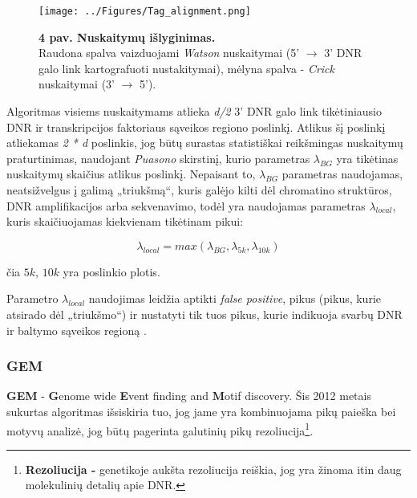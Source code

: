 \documentclass[12pt]{article}
\begin{document}
\begin{figure}[ht]
    \begin{center}
        \captionsetup{justification=centering}
        \texttt{[image: ../Figures/Tag\_alignment.png]}
        \vspace{-1\baselineskip}
        \caption*{\small\textbf{4 pav. Nuskaitymų išlyginimas.}\\Raudona spalva
            vaizduojami \emph{Watson} nuskaitymai (5' \(\rightarrow\) 3' DNR
            galo link kartografuoti nustakitymai),
            mėlyna spalva - \emph{Crick} nuskaitymai (3' \(\rightarrow\) 5').}
    \end{center}
\end{figure}

Algoritmas visiems nuskaitymams atlieka \emph{d/2} 3' DNR galo link
tikėtiniausio DNR ir transk\-rip\-ci\-jos faktoriaus sąveikos regiono poslinkį.
Atlikus šį poslinkį atliekamas \emph{2 * d} poslinkis, jog būtų surastas
statistiškai reikšmingas nuskaitymų praturtinimas, naudojant \emph{Puasono}
skirstinį, kurio parametras \(\lambda_{BG}\) yra tikėtinas nuskaitymų skaičius
atlikus poslinkį. Nepaisant to, \(\lambda_{BG}\) parametras naudojamas,
neatsižvelgus į galimą „triukšmą“, kuris galėjo kilti dėl chromatino struktūros,
DNR amplifikacijos arba sekvenavimo, todėl yra naudojamas parametras
\(\lambda_{local}\), kuris skaičiuojamas kiekvienam tikėtinam
pikui:

\begin{equation} \label{lambda_local}
    \lambda_{local} = max(\lambda_{BG}, \lambda_{5k}, \lambda_{10k})
\end{equation}

čia \(5k\), \(10k\) yra poslinkio plotis.

Parametro \(\lambda_{local}\) naudojimas leidžia aptikti \emph{false positive},
pikus (pikus, kurie atsirado dėl „triukšmo“) ir nustatyti tik tuos pikus,
kurie indikuoja svarbų DNR ir baltymo sąveikos regioną \cite{ARTICLE12}.
  
\subsubsection{GEM}
\textbf{GEM} - \textbf{G}enome wide \textbf{E}vent finding and \textbf{M}otif
discovery. Šis 2012 metais sukurtas algoritmas išsiskiria tuo, jog jame yra
kombinuojama pikų paieška bei motyvų analizė, jog būtų pagerinta galutinių pikų
rezoliucija\footnote{\textbf{Rezoliucija - } genetikoje aukšta rezoliucija
reiškia, jog yra žinoma itin daug molekulinių detalių apie DNR.}.\\
\end{document}
